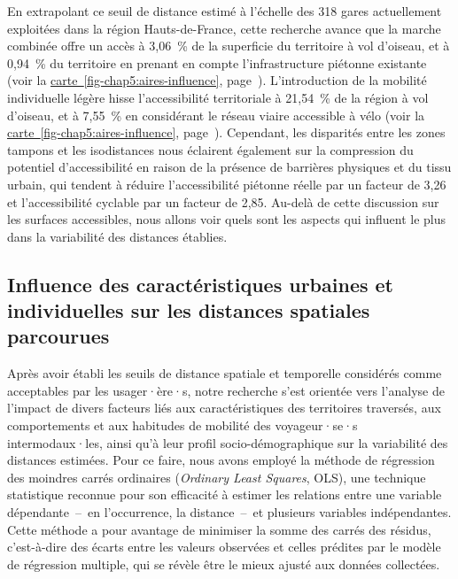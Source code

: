 \begin{refsegment}
En extrapolant ce seuil de distance estimé à l'échelle des 318 gares actuellement exploitées dans la région Hauts-de-France, cette recherche avance que la marche combinée offre un accès à 3,06~\% de la superficie du territoire à vol d'oiseau, et à 0,94~\% du territoire en prenant en compte l'infrastructure piétonne existante (voir la \hyperref[fig-chap5:impedance-distances]{carte~\ref{fig-chap5:aires-influence}}, page~\pageref{fig-chap5:aires-influence}). L'introduction de la mobilité individuelle légère hisse l'accessibilité territoriale à 21,54~\% de la région à vol d'oiseau, et à 7,55~\% en considérant le réseau viaire accessible à vélo (voir la \hyperref[fig-chap5:impedance-distances]{carte~\ref{fig-chap5:aires-influence}}, page~\pageref{fig-chap5:aires-influence}). Cependant, les disparités entre les zones tampons et les isodistances nous éclairent également sur la compression du potentiel d'accessibilité en raison de la présence de barrières physiques et du tissu urbain, qui tendent à réduire l'accessibilité piétonne réelle par un facteur de 3,26 et l'accessibilité cyclable par un facteur de 2,85. Au-delà de cette discussion sur les surfaces accessibles, nous allons voir quels sont les aspects qui influent le plus dans la variabilité des distances établies.%

\subsection{Influence des caractéristiques urbaines et individuelles sur les distances spatiales parcourues
    \label{chap5:regression-distances}
    }

Après avoir établi les seuils de distance spatiale et temporelle considérés comme acceptables par les usager·ère·s, notre recherche s'est orientée vers l'analyse de l'impact de divers facteurs liés aux caractéristiques des territoires traversés, aux comportements et aux habitudes de mobilité des voyageur·se·s intermodaux·les, ainsi qu'à leur profil socio-démographique sur la variabilité des distances estimées. Pour ce faire, nous avons employé la méthode de régression des moindres carrés ordinaires (\textsl{Ordinary Least Squares}, OLS), une technique statistique reconnue pour son efficacité à estimer les relations entre une variable dépendante~–~en l'occurrence, la distance~–~et plusieurs variables indépendantes. Cette méthode a pour avantage de minimiser la somme des carrés des résidus, c'est-à-dire des écarts entre les valeurs observées et celles prédites par le modèle de régression multiple, qui se révèle être le mieux ajusté aux données collectées.%


\end{refsegment}

